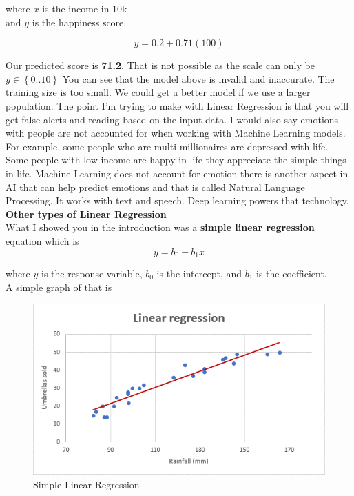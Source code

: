 where $x$ is the income in 10k \\
and $y$ is the happiness score.

\begin{equation}
    y=0.2+0.71(100)
\end{equation}

Our predicted score is \textbf{71.2}. That is not possible as the scale can only be $y \in \left\{0..10\right\}$
You can see that the model above is invalid and inaccurate. The training size is too small. We could get a better model if we use a larger population. The point I’m trying to make with Linear Regression is that you will get false alerts and reading based on the input data. I would also say emotions with people are not accounted for when working with Machine Learning models. For example, some people who are multi-millionaires are depressed with life. Some people with low income are happy in life they appreciate the simple things in life. Machine Learning does not account for emotion there is another aspect in AI that can help predict emotions and that is called Natural Language Processing. It works with text and speech. Deep learning powers that technology.\\

\textbf{Other types of Linear Regression} \\
What I showed you in the introduction was a \textbf{simple linear regression} equation which is 
\begin{equation}
y = b_0 + b_1 x
\end{equation}

where $y$ is the response variable, $b_0$ is the intercept, and $b_1$ is the coefficient. \\

A simple graph of that is 
\begin{figure}[H]
    \includegraphics[width=\linewidth]{images/simplereg.png}
    \caption{Simple Linear Regression}
    \label{fig:simplelinearreg}
\end{figure}

